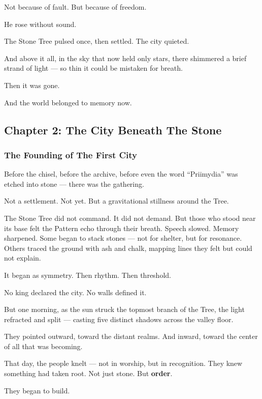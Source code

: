 \documentclass[12pt]{article}
\begin{document}
Not because of fault.  
But because of freedom.

He rose without sound.

The Stone Tree pulsed once, then settled.  
The city quieted.

And above it all, in the sky that now held only stars, there shimmered a brief strand of light — so thin it could be mistaken for breath.

Then it was gone.

And the world belonged to memory now.

\newpage

\subsection*{Chapter 2: The City Beneath The Stone}

\vspace{.5in}

\subsubsection*{The Founding of The First City}

Before the chisel, before the archive, before even the word “Priimydia” was etched into stone — there was the gathering.

Not a settlement. Not yet.  
But a gravitational stillness around the Tree.

The Stone Tree did not command. It did not demand.  
But those who stood near its base felt the Pattern echo through their breath.  
Speech slowed. Memory sharpened.  
Some began to stack stones — not for shelter, but for resonance.  
Others traced the ground with ash and chalk, mapping lines they felt but could not explain.

It began as symmetry.  
Then rhythm.  
Then threshold.

No king declared the city.  
No walls defined it.

But one morning, as the sun struck the topmost branch of the Tree, the light refracted and split —  
casting five distinct shadows across the valley floor.

They pointed outward, toward the distant realms.  
And inward, toward the center of all that was becoming.

That day, the people knelt — not in worship, but in recognition.  
They knew something had taken root.  
Not just stone.  
But \textbf{order}.

They began to build.
\end{document}
